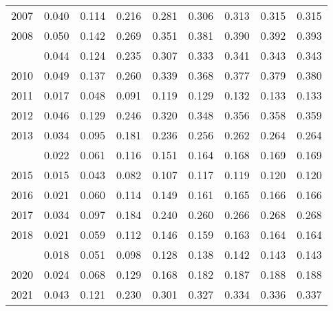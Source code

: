 \documentclass[
]{article}
\begin{document}
\begin{longtable}[t]{lrrrrrrrr}
2007 & 0.040 & 0.114 & 0.216 & 0.281 & 0.306 & 0.313 & 0.315 & 0.315\\
2008 & 0.050 & 0.142 & 0.269 & 0.351 & 0.381 & 0.390 & 0.392 & 0.393\\
\addlinespace
2009 & 0.044 & 0.124 & 0.235 & 0.307 & 0.333 & 0.341 & 0.343 & 0.343\\
2010 & 0.049 & 0.137 & 0.260 & 0.339 & 0.368 & 0.377 & 0.379 & 0.380\\
2011 & 0.017 & 0.048 & 0.091 & 0.119 & 0.129 & 0.132 & 0.133 & 0.133\\
2012 & 0.046 & 0.129 & 0.246 & 0.320 & 0.348 & 0.356 & 0.358 & 0.359\\
2013 & 0.034 & 0.095 & 0.181 & 0.236 & 0.256 & 0.262 & 0.264 & 0.264\\
\addlinespace
2014 & 0.022 & 0.061 & 0.116 & 0.151 & 0.164 & 0.168 & 0.169 & 0.169\\
2015 & 0.015 & 0.043 & 0.082 & 0.107 & 0.117 & 0.119 & 0.120 & 0.120\\
2016 & 0.021 & 0.060 & 0.114 & 0.149 & 0.161 & 0.165 & 0.166 & 0.166\\
2017 & 0.034 & 0.097 & 0.184 & 0.240 & 0.260 & 0.266 & 0.268 & 0.268\\
2018 & 0.021 & 0.059 & 0.112 & 0.146 & 0.159 & 0.163 & 0.164 & 0.164\\
\addlinespace
2019 & 0.018 & 0.051 & 0.098 & 0.128 & 0.138 & 0.142 & 0.143 & 0.143\\
2020 & 0.024 & 0.068 & 0.129 & 0.168 & 0.182 & 0.187 & 0.188 & 0.188\\
2021 & 0.043 & 0.121 & 0.230 & 0.301 & 0.327 & 0.334 & 0.336 & 0.337\\*
\end{longtable}
\end{document}
